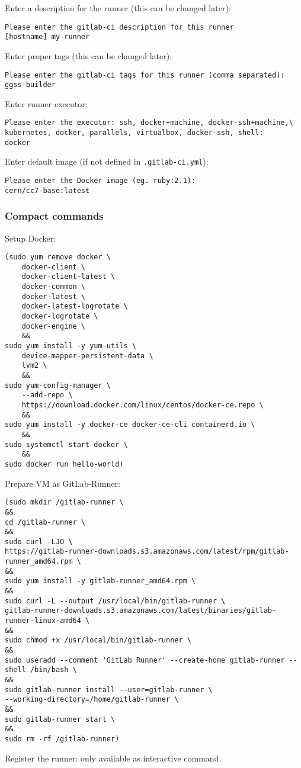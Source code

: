 \noindent
Enter a description for the runner (this can be changed later):
\begin{lstlisting}
Please enter the gitlab-ci description for this runner
[hostname] my-runner
\end{lstlisting}

\noindent
Enter proper tags (this can be changed later):
\begin{lstlisting}
Please enter the gitlab-ci tags for this runner (comma separated):
ggss-builder
\end{lstlisting}

\noindent
Enter runner executor:
\begin{lstlisting}
Please enter the executor: ssh, docker+machine, docker-ssh+machine,\
kubernetes, docker, parallels, virtualbox, docker-ssh, shell:
docker
\end{lstlisting}

\noindent
Enter default image (if not defined in \lstinline{.gitlab-ci.yml}):
\begin{lstlisting}
Please enter the Docker image (eg. ruby:2.1):
cern/cc7-base:latest
\end{lstlisting}


\clearpage
\subsubsection*{Compact commands}

\noindent
Setup Docker:
\begin{lstlisting}[basicstyle=\ttfamily\scriptsize]
(sudo yum remove docker \
    docker-client \
    docker-client-latest \
    docker-common \
    docker-latest \
    docker-latest-logrotate \
    docker-logrotate \
    docker-engine \
    &&
sudo yum install -y yum-utils \
    device-mapper-persistent-data \
    lvm2 \
    &&
sudo yum-config-manager \
    --add-repo \
    https://download.docker.com/linux/centos/docker-ce.repo \
    &&
sudo yum install -y docker-ce docker-ce-cli containerd.io \
    &&
sudo systemctl start docker \
    &&
sudo docker run hello-world)
\end{lstlisting}

\noindent
Prepare VM as GitLab-Runner:
\begin{lstlisting}[basicstyle=\ttfamily\scriptsize]
(sudo mkdir /gitlab-runner \
&&
cd /gitlab-runner \
&&
sudo curl -LJO \
https://gitlab-runner-downloads.s3.amazonaws.com/latest/rpm/gitlab-runner_amd64.rpm \
&&
sudo yum install -y gitlab-runner_amd64.rpm \
&&
sudo curl -L --output /usr/local/bin/gitlab-runner \
gitlab-runner-downloads.s3.amazonaws.com/latest/binaries/gitlab-runner-linux-amd64 \
&&
sudo chmod +x /usr/local/bin/gitlab-runner \
&&
sudo useradd --comment 'GitLab Runner' --create-home gitlab-runner --shell /bin/bash \
&&
sudo gitlab-runner install --user=gitlab-runner \
--working-directory=/home/gitlab-runner \
&&
sudo gitlab-runner start \
&&
sudo rm -rf /gitlab-runner)
\end{lstlisting}

\noindent
Register the runner: only available as interactive command.